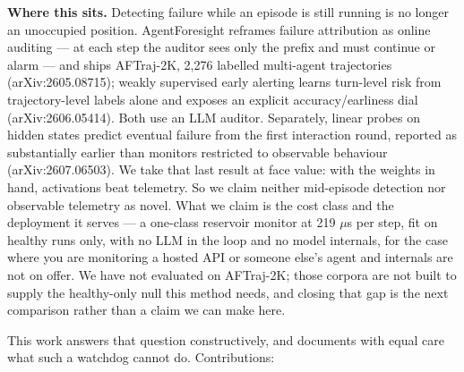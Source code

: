 \documentclass[11pt]{article}
\begin{document}
\textbf{Where this sits.} Detecting failure while an episode is still running is no longer an unoccupied position. AgentForesight reframes failure attribution as online auditing --- at each step the auditor sees only the prefix and must continue or alarm --- and ships AFTraj-2K, 2,276 labelled multi-agent trajectories (arXiv:2605.08715); weakly supervised early alerting learns turn-level risk from trajectory-level labels alone and exposes an explicit accuracy/earliness dial (arXiv:2606.05414). Both use an LLM auditor. Separately, linear probes on hidden states predict eventual failure from the first interaction round, reported as substantially earlier than monitors restricted to observable behaviour (arXiv:2607.06503). We take that last result at face value: with the weights in hand, activations beat telemetry. So we claim neither mid-episode detection nor observable telemetry as novel. What we claim is the cost class and the deployment it serves --- a one-class reservoir monitor at 219 $\mu$s per step, fit on healthy runs only, with no LLM in the loop and no model internals, for the case where you are monitoring a hosted API or someone else's agent and internals are not on offer. We have not evaluated on AFTraj-2K; those corpora are not built to supply the healthy-only null this method needs, and closing that gap is the next comparison rather than a claim we can make here.


This work answers that question constructively, and documents with equal care what such a watchdog cannot do. Contributions:
\end{document}
